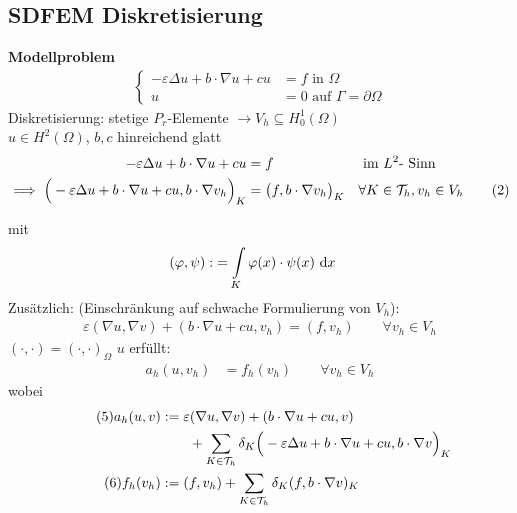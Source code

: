 \subsection{SDFEM Diskretisierung}
\textbf{Modellproblem}
\begin{align}\label{eq7.2_1}\tag{1}
	\left\lbrace\begin{array}{rl}
		-\varepsilon\Delta u+b\cdot\nabla u+cu&=f\text{ in }\Omega\\
		u&=0\text{ auf }\Gamma=\partial\Omega
	\end{array}\right.
\end{align}
Diskretisierung: stetige $P_r$-Elemente $\to V_h\subseteq H_0^1(\Omega)$\\
$u\in H^2(\Omega)$, $b,c$ hinreichend glatt
\begin{align}\nonumber
	-\varepsilon\Delta u+b\cdot \nabla u+cu&= f&&\text{ im }L^2\text{- Sinn}\\
	\implies\Big(-\varepsilon\Delta u+b\cdot\nabla u+cu,b\cdot\nabla v_h\Big)_K&=\big(f,b\cdot\nabla v_h\big)_K
	&&\forall K\in\mathcal{T}_h,v_h\in V_h
	\label{eq7.2_2}\tag{2}
\end{align}

mit
\begin{align*}
	(\varphi,\psi):&=\int\limits_K\varphi(x)\cdot\psi(x)\text{ d} x
\end{align*}
Zusätzlich: (Einschränkung auf schwache Formulierung von $V_h$):
\begin{align*}\label{eq7.2_3}\tag{3}
	\varepsilon(\nabla u,\nabla v)+(b\cdot\nabla u+ cu,v_h)=(f,v_h)\qquad\forall v_h\in V_h
\end{align*}
$(\cdot,\cdot)=(\cdot,\cdot)_\Omega$\nl
$u$ erfüllt:
\begin{align}\label{eq7.2_4}\tag{4}
	a_h(u,v_h)&=f_h(v_h)\qquad\forall v_h\in V_h
\end{align}
wobei
\begin{align}\label{eq7.2_5}\tag{5}
	a_h(u,v)&:=\varepsilon(\nabla u,\nabla v)+(b\cdot\nabla u+cu, v)\\\nonumber
	&\qquad+\sum\limits_{K\in\mathcal{T}_h}\delta_K\Big(-\varepsilon\Delta u+b\cdot\nabla u+cu,b\cdot\nabla v\Big)_K\\
	\label{eq7.2_6}\tag{6}
	f_h(v_h)&:=(f,v_h)+\sum\limits_{K\in\mathcal{T}_h}\delta_K(f,b\cdot\nabla v)_K
\end{align}

